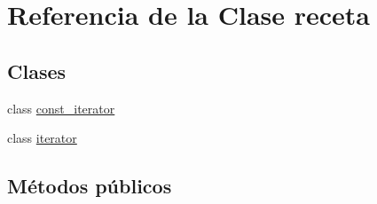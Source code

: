 \hypertarget{classreceta}{}\section{Referencia de la Clase receta}
\label{classreceta}
\subsection*{Clases}
\begin{DoxyCompactItemize}
\item 
class \hyperlink{classreceta_1_1const__iterator}{const\+\_\+iterator}
\item 
class \hyperlink{classreceta_1_1iterator}{iterator}
\end{DoxyCompactItemize}
\subsection*{Métodos públicos}
